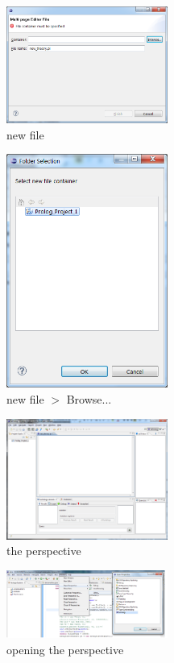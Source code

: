 \begin{figure}
\centering
  \includegraphics[width=200px]{images/plugin3.png}
  \caption{new \tuprolog{} file}\label{fig:plugin3}
\end{figure}

\begin{figure}
\centering
  \includegraphics[width=200px]{images/plugin4.png}
  \caption{new \tuprolog{} file $>$ Browse...}\label{fig:plugin4}
\end{figure}

\begin{figure}
\centering
  \includegraphics[width=200px]{images/plugin5.png}
  \caption{the \tuprolog{} perspective}\label{fig:plugin5}
\end{figure}

\begin{figure}
\centering
  \includegraphics[width=200px]{images/plugin6.png}
  \caption{opening the \tuprolog{} perspective}\label{fig:plugin6}
\end{figure}


